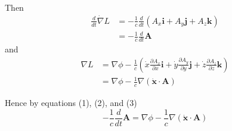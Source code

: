 \documentclass[12pt]{article}
\begin{document}
Then
\begin{align*}
\frac{d}{dt}\dot\nabla L
&=-\frac{1}{c}\frac{d}{dt}(A_x\mathbf i+A_y\mathbf j+A_z\mathbf k)
\\[1ex]
&=-\frac{1}{c}\frac{d}{dt}\mathbf A
\tag{2}
\end{align*}
and
\begin{align*}
\nabla L
&=\nabla\phi-\frac{1}{c}
\left(
\dot x\frac{\partial A_x}{\partial x}\mathbf i
+\dot y\frac{\partial A_y}{\partial y}\mathbf j
+\dot z\frac{\partial A_z}{\partial z}\mathbf k
\right)
\\
&=\nabla\phi-\frac{1}{c}\nabla(\dot{\mathbf x}\cdot\mathbf A)
\tag{3}
\end{align*}

Hence by equations (1), (2), and (3)
\begin{equation*}
-\frac{1}{c}\frac{d}{dt}\mathbf A=\nabla\phi
-\frac{1}{c}\nabla(\dot{\mathbf x}\cdot\mathbf A)
\end{equation*}

\end{document}
